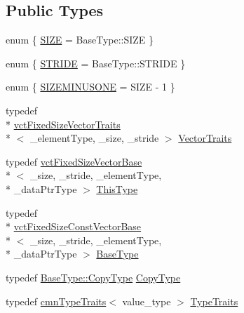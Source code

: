 \subsection*{Public Types}
\begin{DoxyCompactItemize}
\item 
enum \{ \hyperlink{classvct_fixed_size_vector_base_a688214b662551929a8d92e4ed7be0d42ae6389ee04e4be20faf1c7639de3202fb}{S\-I\-Z\-E} = Base\-Type\-:\-:S\-I\-Z\-E
 \}
\item 
enum \{ \hyperlink{classvct_fixed_size_vector_base_ace3f97f061ae60acb29f9719787d18a3a953b66e9631c2c4ff134062e7e09a37d}{S\-T\-R\-I\-D\-E} = Base\-Type\-:\-:S\-T\-R\-I\-D\-E
 \}
\item 
enum \{ \hyperlink{classvct_fixed_size_vector_base_a62a887358e152bf19a5f474546afa3c3acee84c36d2ff88a921ce7d01e86c4676}{S\-I\-Z\-E\-M\-I\-N\-U\-S\-O\-N\-E} = S\-I\-Z\-E -\/ 1
 \}
\item 
typedef \\*
\hyperlink{classvct_fixed_size_vector_traits}{vct\-Fixed\-Size\-Vector\-Traits}\\*
$<$ \-\_\-element\-Type, \-\_\-size, \-\_\-stride $>$ \hyperlink{classvct_fixed_size_vector_base_adacd2ddaf3408250dbcfc8fe5fecfd32}{Vector\-Traits}
\item 
typedef \hyperlink{classvct_fixed_size_vector_base}{vct\-Fixed\-Size\-Vector\-Base}\\*
$<$ \-\_\-size, \-\_\-stride, \-\_\-element\-Type, \\*
\-\_\-data\-Ptr\-Type $>$ \hyperlink{classvct_fixed_size_vector_base_a44798eb609f1e32d7fa8f1ac63d3f894}{This\-Type}
\item 
typedef \\*
\hyperlink{classvct_fixed_size_const_vector_base}{vct\-Fixed\-Size\-Const\-Vector\-Base}\\*
$<$ \-\_\-size, \-\_\-stride, \-\_\-element\-Type, \\*
\-\_\-data\-Ptr\-Type $>$ \hyperlink{classvct_fixed_size_vector_base_a91288c3a362ee7685859f42a9a3667c4}{Base\-Type}
\item 
typedef \hyperlink{classvct_fixed_size_const_vector_base_aaf3accb7cec5765478b5d8fa39c22408}{Base\-Type\-::\-Copy\-Type} \hyperlink{classvct_fixed_size_vector_base_a136da6f4bb90964f3f156533f85416d9}{Copy\-Type}
\item 
typedef \hyperlink{classcmn_type_traits}{cmn\-Type\-Traits}$<$ value\-\_\-type $>$ \hyperlink{classvct_fixed_size_vector_base_ad6d90437534a054c5beb020f588b0b02}{Type\-Traits}
\item 

\end{DoxyCompactItemize}
